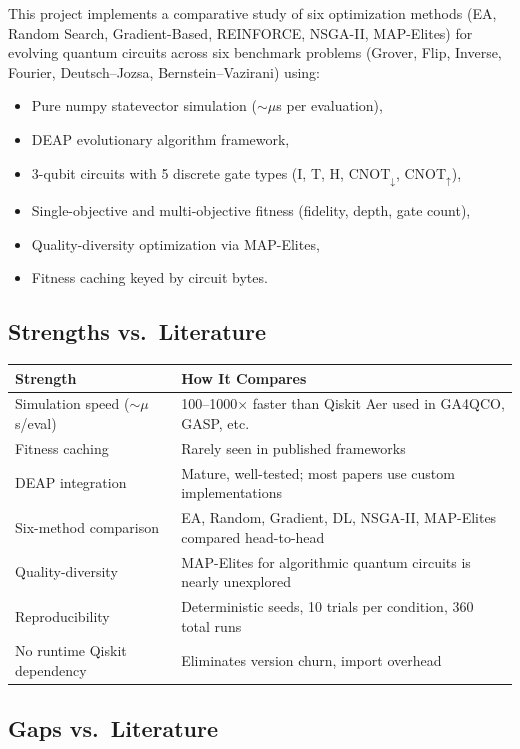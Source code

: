 \documentclass[11pt]{article}
\begin{document}
This project implements a comparative study of six optimization methods (EA, Random Search, Gradient-Based, REINFORCE, NSGA-II, MAP-Elites) for evolving quantum circuits across six benchmark problems (Grover, Flip, Inverse, Fourier, Deutsch--Jozsa, Bernstein--Vazirani) using:
\begin{itemize}
    \item Pure numpy statevector simulation (${\sim}\mu$s per evaluation),
    \item DEAP evolutionary algorithm framework,
    \item 3-qubit circuits with 5 discrete gate types (I, T, H, CNOT$_\downarrow$, CNOT$_\uparrow$),
    \item Single-objective and multi-objective fitness (fidelity, depth, gate count),
    \item Quality-diversity optimization via MAP-Elites,
    \item Fitness caching keyed by circuit bytes.
\end{itemize}

\subsection{Strengths vs.\ Literature}

\begin{longtable}{p{4.5cm} p{9.5cm}}
\toprule
\textbf{Strength} & \textbf{How It Compares} \\
\midrule
\endhead
Simulation speed (${\sim}\mu$s/eval) & 100--1000$\times$ faster than Qiskit Aer used in GA4QCO, GASP, etc. \\
\addlinespace
Fitness caching & Rarely seen in published frameworks \\
\addlinespace
DEAP integration & Mature, well-tested; most papers use custom implementations \\
\addlinespace
Six-method comparison & EA, Random, Gradient, DL, NSGA-II, MAP-Elites compared head-to-head \\
\addlinespace
Quality-diversity & MAP-Elites for algorithmic quantum circuits is nearly unexplored \\
\addlinespace
Reproducibility & Deterministic seeds, 10 trials per condition, 360 total runs \\
\addlinespace
No runtime Qiskit dependency & Eliminates version churn, import overhead \\
\bottomrule
\end{longtable}

\subsection{Gaps vs.\ Literature}
\end{document}

